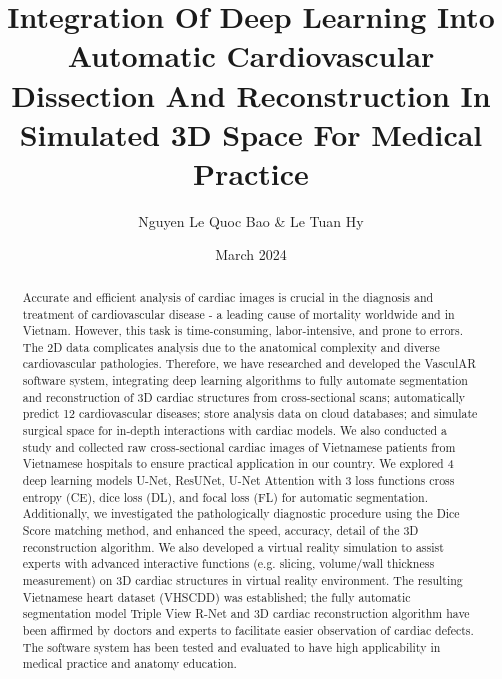 \documentclass{article}
\title{\textbf{Integration Of Deep Learning Into Automatic Cardiovascular Dissection And Reconstruction In Simulated 3D Space For Medical Practice}}
\author{Nguyen Le Quoc Bao \& Le Tuan Hy}
\date{March 2024}
\begin{document}
\maketitle

\begin{center}
\begin{minipage}{0.8\textwidth}
\setlength{\leftskip}{3.5cm} 
\setlength{\rightskip}{3.5cm}
\begin{abstract}
    Accurate and efficient analysis of cardiac images is crucial in the diagnosis and treatment of cardiovascular disease - a leading cause of mortality worldwide and in Vietnam. However, this task is time-consuming, labor-intensive, and prone to errors. The 2D data complicates analysis due to the anatomical complexity and diverse cardiovascular pathologies. Therefore, we have researched and developed the VasculAR software system, integrating deep learning algorithms to fully automate segmentation and reconstruction of 3D cardiac structures from cross-sectional scans; automatically predict 12 cardiovascular diseases; store analysis data on cloud databases; and simulate surgical space for in-depth interactions with cardiac models. We also conducted a study and collected raw cross-sectional cardiac images of Vietnamese patients from Vietnamese hospitals to ensure practical application in our country. We explored 4 deep learning models U-Net, ResUNet, U-Net Attention with 3 loss functions cross entropy (CE), dice loss (DL), and focal loss (FL) for automatic segmentation. Additionally, we investigated the pathologically diagnostic procedure using the Dice Score matching method, and enhanced the speed, accuracy, detail of the 3D reconstruction algorithm. We also developed a virtual reality simulation to assist experts with advanced interactive functions (e.g. slicing, volume/wall thickness measurement) on 3D cardiac structures in virtual reality environment. The resulting Vietnamese heart dataset (VHSCDD) was established; the fully automatic segmentation model Triple View R-Net and 3D cardiac reconstruction algorithm have been affirmed by doctors and experts to facilitate easier observation of cardiac defects. The software system has been tested and evaluated to have high applicability in medical practice and anatomy education. \\
\end{abstract}
\end{minipage}
\end{center}
\end{document}
